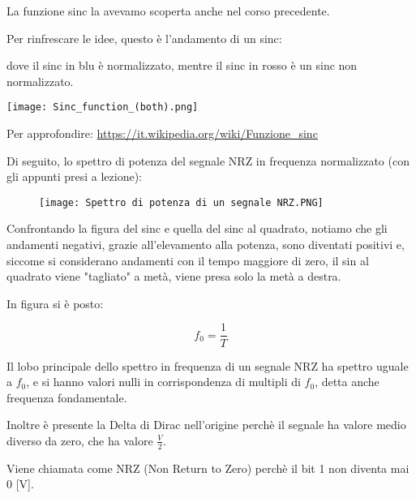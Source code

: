 \newpage 

\begin{tcolorbox}
    La funzione sinc la avevamo scoperta anche nel corso precedente. \newline 

    Per rinfrescare le idee, questo è l'andamento di un sinc: 

    dove il sinc in blu è normalizzato, mentre il sinc in rosso è un sinc non normalizzato. \newline 
    
    \texttt{[image: Sinc\_function\_(both).png]}
    
    Per approfondire: \newline 
    \url{https://it.wikipedia.org/wiki/Funzione_sinc}
\end{tcolorbox}

Di seguito, lo spettro di potenza del segnale NRZ in frequenza normalizzato (con gli appunti presi a lezione): 


\begin{figure}[h]
    \centering
    \texttt{[image: Spettro di potenza di un segnale NRZ.PNG]}
\end{figure}

\begin{tcolorbox}
    Confrontando la figura del sinc e quella del sinc al quadrato, notiamo che gli andamenti negativi, 
    grazie all'elevamento alla potenza, sono diventati positivi e, siccome si considerano andamenti con il tempo maggiore di zero, 
    il sin al quadrato viene "tagliato" a metà, viene presa solo la metà a destra.  

\end{tcolorbox}

In figura si è posto: 

{
    \Large 
    \begin{equation}
        f_0 = \frac{1}{T}
    \end{equation}
}

Il lobo principale dello spettro in frequenza di un segnale NRZ ha spettro uguale a $f_0$, 
e si hanno valori nulli in corrispondenza di multipli di $f_0$, detta anche frequenza fondamentale. \newline 

Inoltre è presente la Delta di Dirac nell'origine perchè il segnale ha valore medio diverso da zero, 
che ha valore $\frac{V}{2}$. \newline 

Viene chiamata come NRZ (Non Return to Zero) perchè il bit 1 non diventa mai 0 [V]. \newline 

